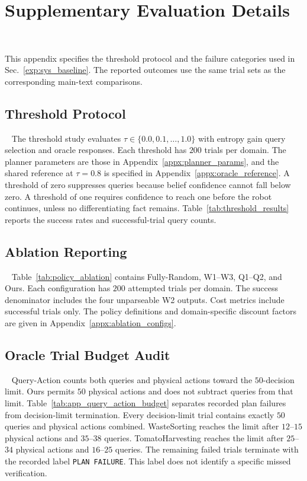 \section{Supplementary Evaluation Details}~\label{appx:exp}

This appendix specifies the threshold protocol and the failure categories used in Sec.~\ref{exp:sys_baseline}. The reported outcomes use the same trial sets as the corresponding main-text comparisons.

\subsection{Threshold Protocol}~\label{appx:threshold_exp}
The threshold study evaluates $\tau\in\{0.0,0.1,\ldots,1.0\}$ with entropy gain query selection and oracle responses. Each threshold has $200$ trials per domain. The planner parameters are those in Appendix~\ref{appx:planner_params}, and the shared reference at $\tau=0.8$ is specified in Appendix~\ref{appx:oracle_reference}. A threshold of zero suppresses queries because belief confidence cannot fall below zero. A threshold of one requires confidence to reach one before the robot continues, unless no differentiating fact remains. Table~\ref{tab:threshold_results} reports the success rates and successful-trial query counts.

\subsection{Ablation Reporting}~\label{appx:policy_comparison}
Table~\ref{tab:policy_ablation} contains Fully-Random, W1--W3, Q1--Q2, and Ours. Each configuration has $200$ attempted trials per domain. The success denominator includes the four unparseable W2 outputs. Cost metrics include successful trials only. The policy definitions and domain-specific discount factors are given in Appendix~\ref{appx:ablation_configs}.

\subsection{Oracle Trial Budget Audit}~\label{appx:oracle_budget_audit}
Query-Action counts both queries and physical actions toward the $50$-decision limit. Ours permits $50$ physical actions and does not subtract queries from that limit. Table~\ref{tab:app_query_action_budget} separates recorded plan failures from decision-limit termination. Every decision-limit trial contains exactly $50$ queries and physical actions combined. WasteSorting reaches the limit after $12$--$15$ physical actions and $35$--$38$ queries. TomatoHarvesting reaches the limit after $25$--$34$ physical actions and $16$--$25$ queries. The remaining failed trials terminate with the recorded label \texttt{PLAN FAILURE}. This label does not identify a specific missed verification.

